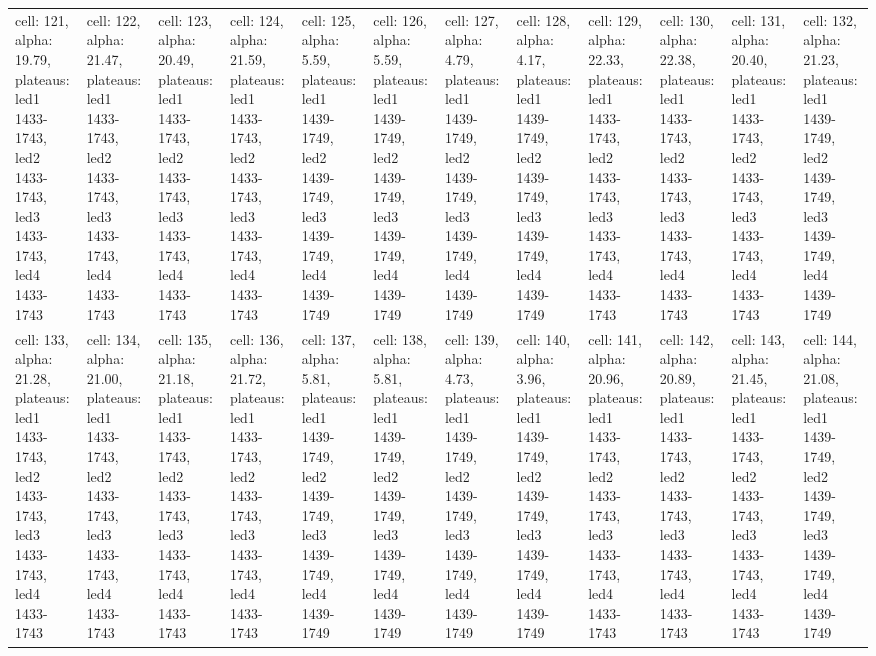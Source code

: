 \begin{landscape}
\begin{longtable}{|l|l|l|l|l|l|l|l|l|l|l|l|}
\rowcolor{lightgray} cell: 121, alpha: 19.79, plateaus: led1 1433-1743, led2 1433-1743, led3 1433-1743, led4 1433-1743 &cell: 122, alpha: 21.47, plateaus: led1 1433-1743, led2 1433-1743, led3 1433-1743, led4 1433-1743 &cell: 123, alpha: 20.49, plateaus: led1 1433-1743, led2 1433-1743, led3 1433-1743, led4 1433-1743 &cell: 124, alpha: 21.59, plateaus: led1 1433-1743, led2 1433-1743, led3 1433-1743, led4 1433-1743 &cell: 125, alpha: 5.59, plateaus: led1 1439-1749, led2 1439-1749, led3 1439-1749, led4 1439-1749 &cell: 126, alpha: 5.59, plateaus: led1 1439-1749, led2 1439-1749, led3 1439-1749, led4 1439-1749 &cell: 127, alpha: 4.79, plateaus: led1 1439-1749, led2 1439-1749, led3 1439-1749, led4 1439-1749 &cell: 128, alpha: 4.17, plateaus: led1 1439-1749, led2 1439-1749, led3 1439-1749, led4 1439-1749 &cell: 129, alpha: 22.33, plateaus: led1 1433-1743, led2 1433-1743, led3 1433-1743, led4 1433-1743 &cell: 130, alpha: 22.38, plateaus: led1 1433-1743, led2 1433-1743, led3 1433-1743, led4 1433-1743 &cell: 131, alpha: 20.40, plateaus: led1 1433-1743, led2 1433-1743, led3 1433-1743, led4 1433-1743 &cell: 132, alpha: 21.23, plateaus: led1 1439-1749, led2 1439-1749, led3 1439-1749, led4 1439-1749 \\
cell: 133, alpha: 21.28, plateaus: led1 1433-1743, led2 1433-1743, led3 1433-1743, led4 1433-1743 &cell: 134, alpha: 21.00, plateaus: led1 1433-1743, led2 1433-1743, led3 1433-1743, led4 1433-1743 &cell: 135, alpha: 21.18, plateaus: led1 1433-1743, led2 1433-1743, led3 1433-1743, led4 1433-1743 &cell: 136, alpha: 21.72, plateaus: led1 1433-1743, led2 1433-1743, led3 1433-1743, led4 1433-1743 &cell: 137, alpha: 5.81, plateaus: led1 1439-1749, led2 1439-1749, led3 1439-1749, led4 1439-1749 &cell: 138, alpha: 5.81, plateaus: led1 1439-1749, led2 1439-1749, led3 1439-1749, led4 1439-1749 &cell: 139, alpha: 4.73, plateaus: led1 1439-1749, led2 1439-1749, led3 1439-1749, led4 1439-1749 &cell: 140, alpha: 3.96, plateaus: led1 1439-1749, led2 1439-1749, led3 1439-1749, led4 1439-1749 &cell: 141, alpha: 20.96, plateaus: led1 1433-1743, led2 1433-1743, led3 1433-1743, led4 1433-1743 &cell: 142, alpha: 20.89, plateaus: led1 1433-1743, led2 1433-1743, led3 1433-1743, led4 1433-1743 &cell: 143, alpha: 21.45, plateaus: led1 1433-1743, led2 1433-1743, led3 1433-1743, led4 1433-1743 &cell: 144, alpha: 21.08, plateaus: led1 1439-1749, led2 1439-1749, led3 1439-1749, led4 1439-1749 \\

\end{longtable}
\end{landscape}
